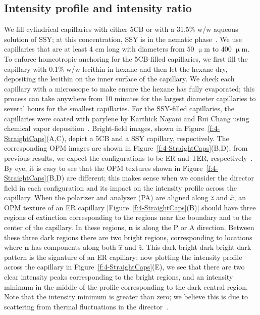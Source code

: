 \subsection{Intensity profile and intensity ratio}
We fill cylindrical capillaries with either 5CB or with a 31.5\% w/w aqueous solution of SSY; at this concentration, SSY is in the nematic phase~\cite{RN303}.
We use capillaries that are at least 4 cm long with diameters from $50$ $\upmu$m to 400 $\upmu$m.
To enforce homeotropic anchoring for the 5CB-filled capillaries, we first fill the capillary with $0.1\%$ w/w lecithin in hexane and then let the hexane dry, depositing the lecithin on the inner surface of the capillary.
We check each capillary with a microscope to make ensure the hexane has fully evaporated; this process can take anywhere from 10 minutes for the largest diameter capillaries to several hours for the smallest capillaries.
For the SSY-filled capillaries, the capillaries were coated with parylene by Karthick Nayani and Rui Chang using chemical vapor deposition~\cite{RN192}.
Bright-field images, shown in Figure~\ref{f:4-StraightCaps}(A,C), depict a 5CB and a SSY capillary, respectively.
The corresponding OPM images are shown in Figure~\ref{f:4-StraightCaps}(B,D); from previous results, we expect the configurations to be ER and TER, respectively~\cite{RN179,RN192}.
By eye, it is easy to see that the OPM textures shown in Figure~\ref{f:4-StraightCaps}(B,D) are different; this makes sense when we consider the director field in each configuration and its impact on the intensity profile across the capillary.
When the polarizer and analyzer (PA) are aligned along $\hat{z}$ and $\hat{x}$, an OPM texture of an ER capillary [Figure~\ref{f:4-StraightCaps}(B)] should have three regions of extinction corresponding to the regions near the boundary and to the center of the capillary.
In these regions, $\mathbf{n}$ is along the P or A direction.
Between these three dark regions there are two bright regions, corresponding to locations where $\mathbf{n}$ has components along both $\hat{x}$ and $\hat{z}$.
This dark-bright-dark-bright-dark pattern is the signature of an ER capillary; now plotting the intensity profile across the capillary in Figure~\ref{f:4-StraightCaps}(E), we see that there are two clear intensity peaks corresponding to the bright regions, and an intensity minimum in the middle of the profile corresponding to the dark central region.
Note that the intensity minimum is greater than zero; we believe this is due to scattering from thermal fluctuations in the director~\cite{RN33}.
